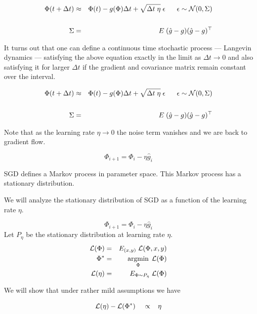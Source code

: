 {

\begin{eqnarray*}
\Phi(t + \Delta t) & \approx & \Phi(t) -g(\Phi)\Delta t + \sqrt{\Delta t\; \eta}\;\epsilon\;\;\;\;\;\; \epsilon \sim {\cal N}(0,\Sigma) \\
\\
\Sigma & = & E\;(\hat{g}-g)(\hat{g}-g)^\top
\end{eqnarray*}

\vfill
It turns out that one can define a continuous time stochastic process --- Langevin dynamics --- satisfying the above equation exactly in the limit as $\Delta t \rightarrow 0$
and also satisfying it for larger $\Delta t$ if the gradient and covariance matrix remain constant over the interval.


\begin{eqnarray*}
\Phi(t + \Delta t) & \approx & \Phi(t) -g(\Phi)\Delta t + \sqrt{\Delta t\; \eta}\;\epsilon\;\;\;\;\;\; \epsilon \sim {\cal N}(0,\Sigma) \\
\\
\Sigma & = & E\;(\hat{g}-g)(\hat{g}-g)^\top
\end{eqnarray*}

\vfill
Note that as the learning rate $\eta \rightarrow 0$ the noise term vanishes and we are back to gradient flow.

$$\Phi_{i+1} = \Phi_i - \eta \hat{g}_i$$

\vfill
SGD defines a Markov process in parameter space.  This Markov process has a stationary distribution.

\vfill
We will analyze the stationary distribution of SGD as a function of the learning rate $\eta$.

$$\Phi_{i+1} = \Phi_i - \eta \hat{g}_i$$
\vfill
Let $P_\eta$ be the stationary distribution at learning rate $\eta$.
\begin{eqnarray*}
{\cal L}(\Phi) & = & E_{(x,y)}\;{\cal L}(\Phi,x,y) \\
\Phi^* & = & \operatorname*{argmin}_\Phi \;{\cal L}(\Phi) \\
{\cal L}(\eta) & = & E_{\Phi \sim P_\eta}\;{\cal L}(\Phi)
\end{eqnarray*}

\vfill
We will show that under rather mild assumptions we have

\vfill
$${\cal L}(\eta) - {\cal L}(\Phi^*)\;\;\;\; \propto \;\;\; \eta$$

}

